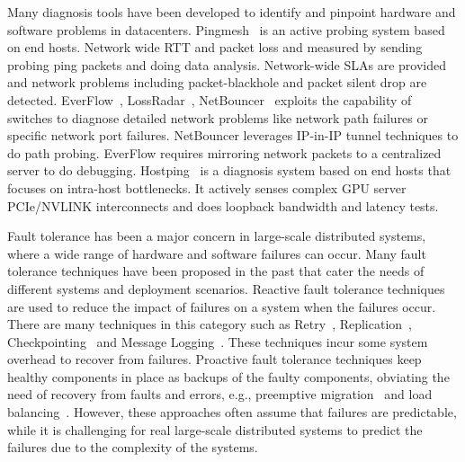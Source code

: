 Many diagnosis tools have been developed
to identify and pinpoint hardware and software problems in datacenters.
Pingmesh~\cite{pingmesh} is an active
probing system based on end hosts. Network wide RTT and packet loss and measured
by sending probing ping packets and doing data analysis. Network-wide SLAs are
provided and network problems including packet-blackhole and packet silent drop
are detected.  EverFlow~\cite{everflow}, LossRadar~\cite{lossradar},
NetBouncer~\cite{netbouncer} exploits the capability of switches to diagnose
detailed network problems like network path failures or specific network port
failures. NetBouncer leverages IP-in-IP tunnel techniques to do path probing.
EverFlow requires mirroring network packets to a centralized server to do
debugging. Hostping~\cite{hostping} is a diagnosis system based on
end hosts that focuses on intra-host bottlenecks. It actively senses complex GPU
server PCIe/NVLINK interconnects and does loopback bandwidth and latency tests.

Fault tolerance has been a major concern in large-scale distributed systems,
where a wide range of hardware and software failures can occur.
Many fault tolerance techniques have been proposed in the past
that cater the needs of different
systems and deployment scenarios.
Reactive fault
tolerance techniques are used to reduce the impact of failures on a system when
the failures occur. There are many techniques in this category such
as Retry~\cite{haider2011fault}, Replication~\cite{haider2011fault},
Checkpointing~\cite{peng2018optimus} and Message
Logging~\cite{tanenbaum2007distributed}.
These techniques incur some system overhead to recover from failures.
Proactive fault tolerance techniques
keep healthy components in place as backups of the faulty
components, obviating the need of recovery from faults and errors, e.g., preemptive
migration~\cite{chakravorty2006proactive, chakravorty2005proactive,
chen2020elastic} and load balancing~\cite{behera2014performance}. However, these
approaches often assume that failures are predictable,
while it is challenging for real
large-scale distributed systems to predict the failures due to the complexity
of the systems.

